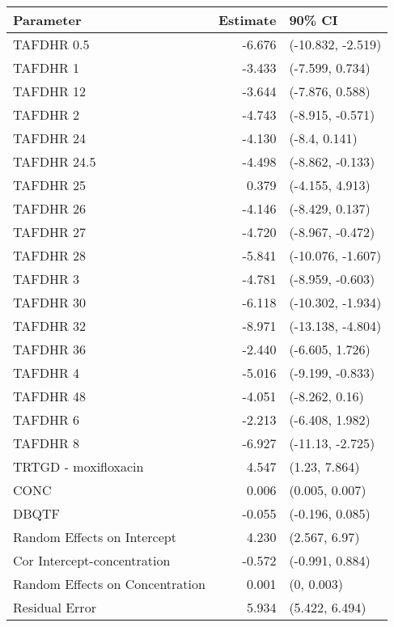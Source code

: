
\begin{tabular}{lrl}
\toprule
Parameter & Estimate & 90\% CI\\
\midrule
TAFDHR 0.5 & -6.676 & (-10.832, -2.519)\\
TAFDHR 1 & -3.433 & (-7.599, 0.734)\\
TAFDHR 12 & -3.644 & (-7.876, 0.588)\\
TAFDHR 2 & -4.743 & (-8.915, -0.571)\\
TAFDHR 24 & -4.130 & (-8.4, 0.141)\\
TAFDHR 24.5 & -4.498 & (-8.862, -0.133)\\
TAFDHR 25 & 0.379 & (-4.155, 4.913)\\
TAFDHR 26 & -4.146 & (-8.429, 0.137)\\
TAFDHR 27 & -4.720 & (-8.967, -0.472)\\
TAFDHR 28 & -5.841 & (-10.076, -1.607)\\
TAFDHR 3 & -4.781 & (-8.959, -0.603)\\
TAFDHR 30 & -6.118 & (-10.302, -1.934)\\
TAFDHR 32 & -8.971 & (-13.138, -4.804)\\
TAFDHR 36 & -2.440 & (-6.605, 1.726)\\
TAFDHR 4 & -5.016 & (-9.199, -0.833)\\
TAFDHR 48 & -4.051 & (-8.262, 0.16)\\
TAFDHR 6 & -2.213 & (-6.408, 1.982)\\
TAFDHR 8 & -6.927 & (-11.13, -2.725)\\
TRTGD - moxifloxacin & 4.547 & (1.23, 7.864)\\
CONC & 0.006 & (0.005, 0.007)\\
DBQTF & -0.055 & (-0.196, 0.085)\\
Random Effects on Intercept & 4.230 & (2.567, 6.97)\\
Cor Intercept-concentration & -0.572 & (-0.991, 0.884)\\
Random Effects on Concentration & 0.001 & (0, 0.003)\\
Residual Error & 5.934 & (5.422, 6.494)\\
\bottomrule
\end{tabular}
